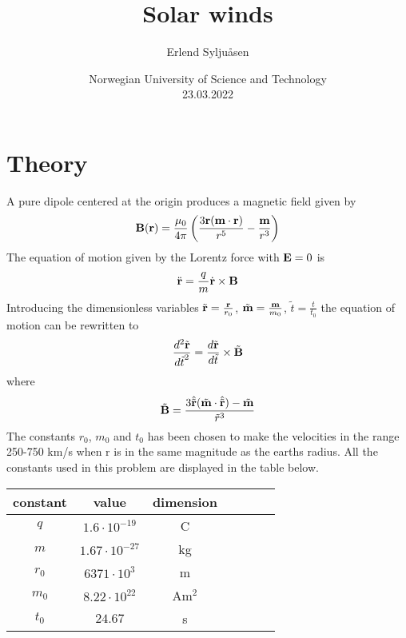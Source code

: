 \documentclass[article,11pt]{article}
\begin{document}
\title{Solar winds}
\author{Erlend Syljuåsen}
\date{Norwegian University of Science and Technology\\23.03.2022}
\maketitle

\begin{abstract}
\end{abstract}

\section{Theory}
A pure dipole centered at the origin produces a magnetic field given by
$$\vectorbold{B}(\vectorbold{r}) = \frac{\mu_0}{4\pi} \left(\frac{3\vectorbold{r}(\vectorbold{m} \cdot \vectorbold{r})}{r^5} - \frac{\vectorbold{m}}{r^3}\right)$$
The equation of motion given by the Lorentz force with $\vectorbold{E} = 0$ is 
$$\ddot{\vectorbold{r}} = \frac{q}{m} \dot{\vectorbold{r}} \times \vectorbold{B}$$
Introducing the dimensionless variables $\tilde{\vectorbold{r}}= \frac{\vectorbold{r}}{r_0}$, $\tilde{\vectorbold{m}} = \frac{\vectorbold{m}}{m_0}$, $\tilde{t}= \frac{t}{t_0}$ the equation of motion can be rewritten to
\begin{equation}
    \frac{d^2 \tilde{\vectorbold{r}}}{{d\tilde{t}}^2} = \frac{d\tilde{\vectorbold{r}}}{d\tilde{t}} \times \tilde{\vectorbold{B}}
\end{equation}
where $$\tilde{\vectorbold{B}} = \frac{3 \hat{\tilde{\vectorbold{r}}} (\tilde{\vectorbold{m}} \cdot \hat{\tilde{\vectorbold{r}}}) - \tilde{\vectorbold{m}}}{{\tilde{r}}^3}$$ 
The constants $r_0$, $m_0$ and $t_0$ has been chosen to make the velocities in the range 250-750 km/s when r is in the same magnitude as the earths radius. All the constants used in this problem are displayed in the table below.
\begin{center}
\begin{tabular}{|c|c|c|c|c|c|c|}
\hline
    constant & value & dimension\\
\hline
    $q$ & $1.6 \cdot 10^{-19}$ & C\\
    $m$ & $1.67 \cdot 10^{-27}$ & kg\\
    $r_0$ & $6371 \cdot 10^3$ & m\\ 
    $m_0$ & $8.22 \cdot 10^{22}$ & Am$^2$\\ 
    $t_0$ & $24.67$ & s\\
\hline
\end{tabular}
\label{table:constants}
\end{center}



\begin{thebibliography}{99}
\end{thebibliography}
\end{document}
